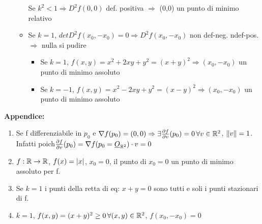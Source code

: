 \begin{example}[1a,foglio 5]
\begin{itemize}
\begin{itemize}
\begin{exercise}
              Se $k^2 < 1 \Rightarrow D^2 f(0,0)$ \ace def. positiva $\Rightarrow$ (0,0) \ace un punto di minimo relativo
            \end{exercise}
            \item Se $k=1$, $detD^2f(x_0,-x_0) = 0 \Rightarrow D^2f(x_0,-x_0)$ non \ace def-neg. n\ace def-pos. $\Rightarrow$ nulla si pu\aco dire
              \begin{itemize}
                \item Se $k=1$, $f(x,y) = x^2+2xy+y^2 = (x+y)^2 \Rightarrow (x_0,-x_0)$ \ace un punto di minimo assoluto
                \item Se $k=-1$, $f(x,y) = x^2-2xy+y^2 = (x-y)^2 \Rightarrow (x_0,-x_0)$ \ace un punto di minimo assoluto
              \end{itemize}
          \end{itemize}
  \end{itemize}
\end{example}
\textbf{Appendice:}
\begin{enumerate}
  \item Se f \ace differenziabile in $p_0$ e $\nabla f(p_0) = (0,0) \Rightarrow \exists \frac{\partial f}{\partial v}(p_0)=0 \, 
        \forall v \in \mathbb{R}^2$, $\left\lVert v\right\rVert=1$. \\
        Infatti poich\ace $\frac{\partial f}{\partial v}(p_0) = \nabla f (p_0 = \underline{O}_{\mathbb{R}^2}) \cdot v = 0$
  \item $f : \mathbb{R} \to \mathbb{R}$, $f(x) = \left\lvert x \right\rvert$, $x_0 = 0$, il punto di $x_0=0$ \ace un punto di minimo assoluto per f.
  \item Se $k=1$ i punti della retta di eq: $x+y=0$ sono tutti e soli i punti stazionari di f.
  \item $k=1$, $f(x,y) = (x+y)^2 \geq 0 \, \forall (x,y)\in \mathbb{R}^2$, $f(x_0,-x_0)=0$
\end{enumerate}

